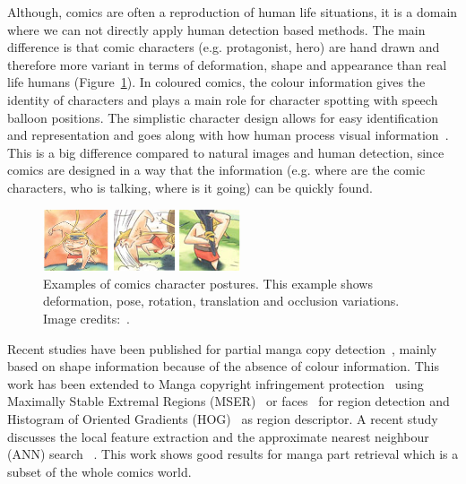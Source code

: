 Although, comics are often a reproduction of human life situations, it is a domain where we can not directly apply human detection based methods.
The main difference is that comic characters (e.g. protagonist, hero) are hand drawn and therefore more variant in terms of deformation, shape and appearance than real life humans (Figure~\ref{fig:sota:tarzan}).
In coloured comics, the colour information gives the identity of characters and plays a main role for character spotting with speech balloon positions. 
The simplistic character design allows for easy identification and representation and goes along with how human process visual information~\cite{ahmadimpactsOfManga,medley2010discerningPictures,cohn2010limits}.
This is a big difference compared to natural images and human detection, since comics are designed in a way that the information (e.g. where are the comic characters, who is talking, where is it going) can be quickly found.%

 \begin{figure}[!ht]	%
 	 \centering
 	\includegraphics[width=220px]{prunelle.png}
 	\caption[Illustration of the diversity of comics character postures]{Examples of comics character postures. This example shows deformation, pose, rotation, translation and occlusion variations. Image credits:~\cite{Prunelle10}.
}
 	\label{fig:sota:tarzan}
 \end{figure}

Recent studies have been published for partial manga copy detection~\cite{Sun2010}, mainly based on shape information because of the absence of colour information.
This work has been extended to Manga copyright infringement protection~\cite{Sun2009Detecting,Sun2013IJDAR} using Maximally Stable Extremal Regions (MSER)~\cite{matas2004robust} or faces~\cite{Viola2004robust} for region detection and Histogram of Oriented Gradients (HOG)~\cite{Dalal05} as region descriptor.
A recent study discusses the local feature extraction and the approximate nearest neighbour (ANN) search~\cite{Iwata2014StudyManga} .
This work shows good results for manga part retrieval which is a subset of the whole comics world.

